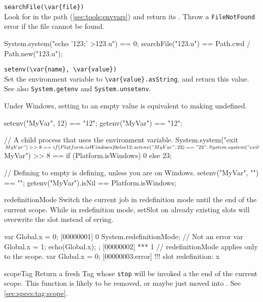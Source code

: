 \begin{urbiscriptapi}
\item \lstinline|searchFile(\var{file})|\\
  Look for  in the \urbi path (\autoref{sec:tools:envvars})
  and return its .  Throw a \lstinline|FileNotFound|
  error if the file cannot be found.
\begin{urbiassert}
System.system("echo '123;' >123.u") == 0;
searchFile("123.u") == Path.cwd / Path.new("123.u");
\end{urbiassert}

\item \lstinline|setenv(\var{name}, \var{value})|\\
  Set the environment variable  to
  \lstinline|\var{value}.asString|, and return this value.  See also
  \lstinline|System.getenv| and \lstinline|System.unsetenv|.
  \begin{windows}
    Under Windows, setting to an empty value is equivalent to
    making undefined.
  \end{windows}

\begin{urbiassert}
setenv("MyVar", 12) == "12";
getenv("MyVar") == "12";

// A child process that uses the environment variable.
System.system("exit $MyVar") >> 8 ==
       {if (Platform.isWindows) 0 else 12};
setenv("MyVar", 23) == "23";
System.system("exit $MyVar") >> 8 ==
       {if (Platform.isWindows) 0 else 23};

// Defining to empty is defining, unless you are on Windows.
setenv("MyVar", "") == "";
getenv("MyVar").isNil == Platform.isWindows;
\end{urbiassert}

\item[redefinitionMode] Switch the current job in redefinition mode
  until the end of the current scope.  While in redefinition mode,
  setSlot on already existing slots will overwrite the slot instead of
  erring.

\begin{urbiscript}
var Global.x = 0;
[00000001] 0
{
  System.redefinitionMode;
  // Not an error
  var Global.x = 1;
  echo(Global.x);
};
[00000002] *** 1
// redefinitionMode applies only to the scope.
var Global.x = 0;
[00000003:error] !!! slot redefinition: x
\end{urbiscript}

\item[scopeTag] Return a fresh Tag whose \lstinline|stop| will be
  invoked a the end of the current scope.  This function is likely to
  be removed, or maybe just moved into .  See
  \autoref{sec:specs:tag:scope}.


\end{urbiscriptapi}
